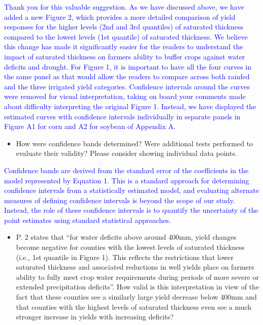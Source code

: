 \documentclass[
]{article}
\providecommand{\tightlist}{%
  \setlength{\itemsep}{0pt}\setlength{\parskip}{0pt}}
\begin{document}
\textcolor{blue}{Thank you for this valuable suggestion. As we have discussed above, we have added a new Figure 2, which provides a more detailed comparison of yield responses for the higher levels (2nd and 3rd quantiles) of saturated thickness compared to the lowest levels (1st quantile) of saturated thickness. We believe this change has made it significantly easier for the readers to understand the impact of saturated thickness on farmers ability to buffer crops against water deficits and drought. For Figure 1, it is important to have all the four curves in the same panel as that would allow the readers to compare across both rainfed and the three irrigated yield categories. Confidence intervals around the curves were removed for visual interpretation, taking on board your comments made about difficulty interpreting the original Figure 1. Instead, we have displayed the estimated curves with confidence intervals individually in separate panels in Figure A1 for corn and A2 for soybean of Appendix A.}

\begin{itemize}
\tightlist
\item
  How were confidence bands determined? Were additional tests performed
  to evaluate their validity? Please consider showing individual data
  points.
\end{itemize}

\textcolor{blue}{Confidence bands are derived from the standard error of the coefficients in the model represented by Equation 1. This is a standard approach for determining confidence intervals from a statistically estimated model, and evaluating alternate measures of defining confidence intervals is beyond the scope of our study. Instead, the role of these confidence intervals is to quantify the uncertainty of the point estimates using standard statistical approaches.}

\begin{itemize}
\tightlist
\item
  P. 2 states that ``for water deficits above around 400mm, yield
  changes become negative for counties with the lowest levels of
  saturated thickness (i.e., 1st quantile in Figure 1). This reflects
  the restrictions that lower saturated thickness and associated
  reductions in well yields place on farmers ability to fully meet crop
  water requirements during periods of more severe or extended
  precipitation deficits''. How valid is this interpretation in view of
  the fact that these counties see a similarly large yield decrease
  below 400mm and that counties with the highest levels of saturated
  thickness even see a much stronger increase in yields with increasing
  deficits?
\end{itemize}
\end{document}
